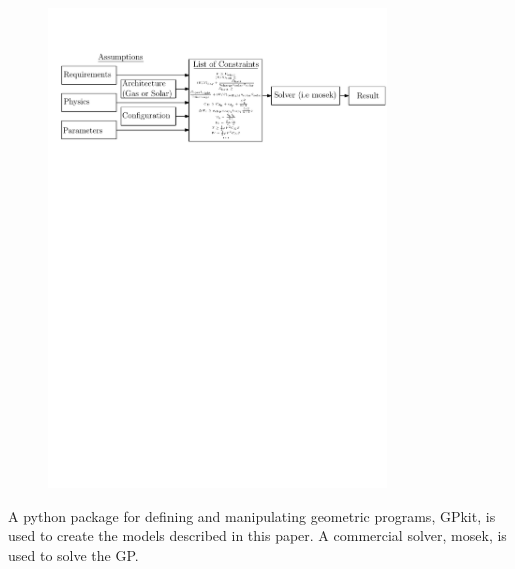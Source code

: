 \begin{figure}[H]
	\begin{center}
	\includegraphics[width=0.8\textwidth,natwidth=480,natheight=200]{flowchart.pdf}
    \caption{\textbf{}}
	\label{f:flowchart}
	\end{center}
\end{figure}

\DIFaddend A python package for defining and manipulating geometric programs, GPkit\cite{gpkitdocs}, is used to create the models described in this paper.  
A commercial solver, mosek\cite{mosek}, is used to solve the GP. 
\DIFaddbegin {}\DIFaddend \\

\section{\DIFdelbegin {}\DIFdelend \DIFaddbegin {}\DIFaddend }

